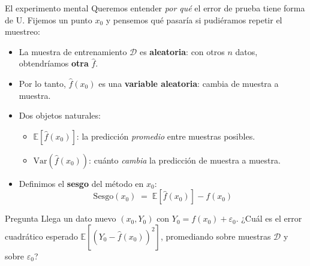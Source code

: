 \documentclass{beamer}
\newcommand{\E}{\mathbb{E}}
\newcommand{\Var}{\mathrm{Var}}
\newcommand{\1}{\mathbb{I}}
\begin{document}
\begin{frame}{El experimento mental}
\small
Queremos entender \emph{por qué} el error de prueba tiene forma de U. Fijemos un punto $x_0$ y pensemos qué pasaría si pudiéramos repetir el muestreo:
\pause
\begin{itemize}\itemsep5pt
  \item La muestra de entrenamiento $\mathcal{D}$ es \textbf{aleatoria}: con otros $n$ datos, obtendríamos \textbf{otra} $\hat{f}$.
  \item Por lo tanto, $\hat{f}(x_0)$ es una \textbf{variable aleatoria}: cambia de muestra a muestra. \pause
  \item Dos objetos naturales:
  \begin{itemize}\itemsep3pt
    \item $\E[\hat{f}(x_0)]$: la predicción \emph{promedio} entre muestras posibles.
    \item $\Var(\hat{f}(x_0))$: cuánto \emph{cambia} la predicción de muestra a muestra.
  \end{itemize} \pause
  \item Definimos el \textbf{sesgo} del método en $x_0$:
  \[ \mathrm{Sesgo}(x_0) \;=\; \E[\hat{f}(x_0)] - f(x_0) \]
\end{itemize}
\pause
\begin{block}{Pregunta}
Llega un dato nuevo $(x_0, Y_0)$ con $Y_0 = f(x_0) + \varepsilon_0$. ¿Cuál es el error cuadrático esperado $\E[(Y_0 - \hat{f}(x_0))^2]$, promediando sobre muestras $\mathcal{D}$ y sobre $\varepsilon_0$?
\end{block}
\end{frame}
\end{document}
